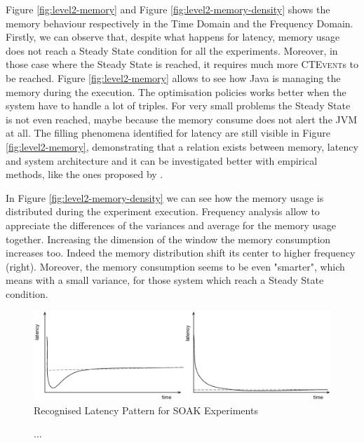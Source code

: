 Figure \ref{fig:level2-memory} and Figure \ref{fig:level2-memory-density} shows the memory behaviour respectively in the Time Domain and the Frequency Domain. Firstly, we can observe that, despite what happens for latency, memory usage does not reach a Steady State condition for all the experiments. Moreover, in those case where the Steady State is reached, it requires much more \textsc{CTEvent}s to be reached. Figure \ref{fig:level2-memory} allows to see how Java is managing the memory during the execution. The optimisation policies works better when the system have to handle a lot of triples. For very small problems the Steady State is not even reached, maybe because the memory consume does not alert the JVM at all. The filling phenomena identified for latency are still visible in Figure \ref{fig:level2-memory}, demonstrating that a relation exists between memory, latency and system architecture and it can be investigated better with empirical methods, like the ones proposed by \namens.

In Figure \ref{fig:level2-memory-density} we can see how the memory usage is distributed during the experiment execution. Frequency analysis allow to appreciate the differences of the variances and average for the memory usage together. Increasing the dimension of the window the memory consumption increases too. Indeed the memory distribution shift its center to higher frequency (right). Moreover, the memory consumption seems to be even "smarter", which means with a small variance, for those system which reach a Steady State condition.


\begin{figure}[hbt]
  \centering
	\includegraphics[width=\linewidth]{images/level2-pattern}
	\caption{Recognised Latency Pattern for SOAK Experiments} 
  	\label{fig:level2-pattern}
\end{figure}

\begin{figure}[hbt]
  \centering
	\caption{...} 
  	\label{fig:level2-latency}
\end{figure}

